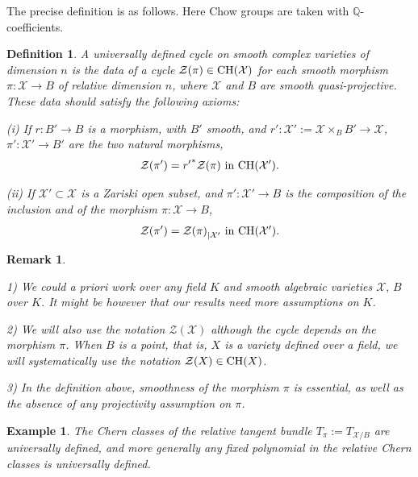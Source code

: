 \documentclass[10pt]{article}
\newtheorem{rema}[theo]{Remark}
\newtheorem{Defi}[theo]{Definition}
\newtheorem{ex}[theo]{Example}
\begin{document}
The precise definition  is as follows. Here Chow groups are taken with $\mathbb{Q}$-coefficients.
\begin{Defi}\label{defiuniversintro}
A universally defined cycle on
smooth complex varieties of dimension $n$ is the data
of a cycle
$\mathcal{Z}(\pi)\in {\rm CH}(\mathcal{X})$ for each
 smooth morphism $\pi: \mathcal{X}\rightarrow B$ of relative dimension $n$, where $\mathcal{X}$ and $B$ are smooth quasi-projective.
These data should satisfy the following axioms:


(i) If $r:B'\rightarrow B$ is a morphism, with $B'$ smooth,
and $r':\mathcal{X}':=\mathcal{X}\times_B B'\rightarrow  \mathcal{X}$, $\pi':\mathcal{X}'\rightarrow  B'$ are the two natural morphisms,
$$ \mathcal{Z}(\pi')={r'}^*\mathcal{Z}(\pi)
\,\,{\rm in}\,\, {\rm CH}(\mathcal{X}').$$


(ii)  If $\mathcal{X}'\subset \mathcal{X}$ is a Zariski open subset, and
$\pi':\mathcal{X}'\rightarrow B$ is the composition of the inclusion and of the morphism
$\pi:\mathcal{X}\rightarrow B$,
$$\mathcal{Z}(\pi')={\mathcal{Z}(\pi)}_{\mid \mathcal{X}'}
\,\,{\rm in}\,\, {\rm CH}(\mathcal{X}').$$
\end{Defi}

\begin{rema}\label{remaintro24} {\rm 1)  We could a priori work over any  field $K$
and smooth algebraic varieties $\mathcal{X},\,B$ over $K$. It might be however that our results need more assumptions on $K$.

2)  We will also  use the notation  $\mathcal{Z}(\mathcal{X})$ although the cycle depends on the morphism
$\pi$. When $B$ is a point, that is, $X$ is  a variety defined over a field, we will systematically  use the notation
$\mathcal{Z}({X})\in{\rm CH}(X)$.

3) In the definition above, smoothness of the morphism $\pi$ is essential, as well as  the absence of any projectivity assumption on
$\pi$.}
\end{rema}
\begin{ex}{\rm The Chern classes of the relative tangent bundle $T_\pi:=T_{\mathcal{X}/B}$
are universally defined, and more generally  any fixed polynomial in the relative Chern classes
is universally defined.
}
\end{ex}
\end{document}
